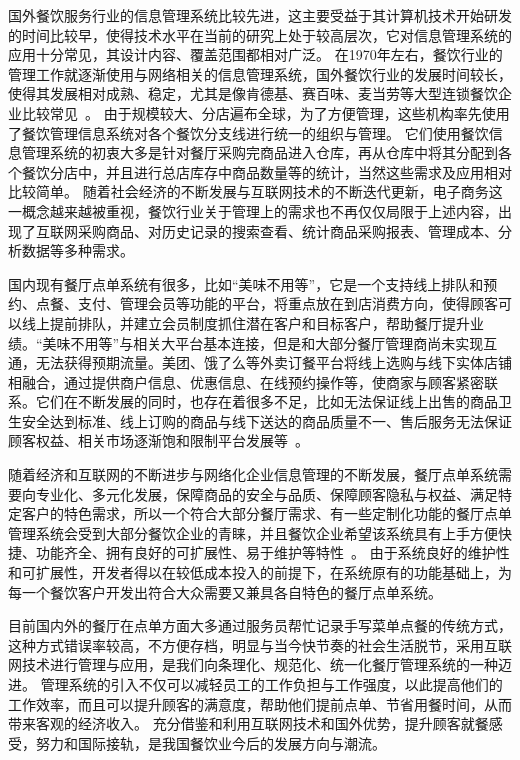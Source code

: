 国外餐饮服务行业的信息管理系统比较先进，这主要受益于其计算机技术开始研发的时间比较早，使得技术水平在当前的研究上处于较高层次，它对信息管理系统的应用十分常见，其设计内容、覆盖范围都相对广泛。
在1970年左右，餐饮行业的管理工作就逐渐使用与网络相关的信息管理系统，国外餐饮行业的发展时间较长，使得其发展相对成熟、稳定，尤其是像肯德基、赛百味、麦当劳等大型连锁餐饮企业比较常见~\cite{yy}。
由于规模较大、分店遍布全球，为了方便管理，这些机构率先使用了餐饮管理信息系统对各个餐饮分支线进行统一的组织与管理。
它们使用餐饮信息管理系统的初衷大多是针对餐厅采购完商品进入仓库，再从仓库中将其分配到各个餐饮分店中，并且进行总店库存中商品数量等的统计，当然这些需求及应用相对比较简单。
随着社会经济的不断发展与互联网技术的不断迭代更新，电子商务这一概念越来越被重视，餐饮行业关于管理上的需求也不再仅仅局限于上述内容，出现了互联网采购商品、对历史记录的搜索查看、统计商品采购报表、管理成本、分析数据等多种需求。

国内现有餐厅点单系统有很多，比如“美味不用等”，它是一个支持线上排队和预约、点餐、支付、管理会员等功能的平台，将重点放在到店消费方向，使得顾客可以线上提前排队，并建立会员制度抓住潜在客户和目标客户，帮助餐厅提升业绩。“美味不用等”与相关大平台基本连接，但是和大部分餐厅管理商尚未实现互通，无法获得预期流量\cite{gcf}。美团、饿了么等外卖订餐平台将线上选购与线下实体店铺相融合，通过提供商户信息、优惠信息、在线预约操作等，使商家与顾客紧密联系。它们在不断发展的同时，也存在着很多不足，比如无法保证线上出售的商品卫生安全达到标准、线上订购的商品与线下送达的商品质量不一、售后服务无法保证顾客权益、相关市场逐渐饱和限制平台发展等~\cite{htxO2O}。

随着经济和互联网的不断进步与网络化企业信息管理的不断发展，餐厅点单系统需要向专业化、多元化发展，保障商品的安全与品质、保障顾客隐私与权益、满足特定客户的特色需求，所以一个符合大部分餐厅需求、有一些定制化功能的餐厅点单管理系统会受到大部分餐饮企业的青睐，并且餐饮企业希望该系统具有上手方便快捷、功能齐全、拥有良好的可扩展性、易于维护等特性~\cite{DBLP:journals/jbi/VelupillaiSLRSM18}。
由于系统良好的维护性和可扩展性，开发者得以在较低成本投入的前提下，在系统原有的功能基础上，为每一个餐饮客户开发出符合大众需要又兼具各自特色的餐厅点单系统。

目前国内外的餐厅在点单方面大多通过服务员帮忙记录手写菜单点餐的传统方式，这种方式错误率较高，不方便存档，明显与当今快节奏的社会生活脱节，采用互联网技术进行管理与应用，是我们向条理化、规范化、统一化餐厅管理系统的一种迈进。
管理系统的引入不仅可以减轻员工的工作负担与工作强度，以此提高他们的工作效率，而且可以提升顾客的满意度，帮助他们提前点单、节省用餐时间，从而带来客观的经济收入。
充分借鉴和利用互联网技术和国外优势，提升顾客就餐感受，努力和国际接轨，是我国餐饮业今后的发展方向与潮流。

